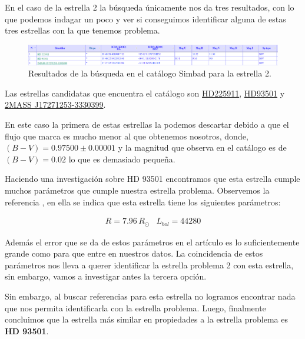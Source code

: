 \documentclass{aa} %
\begin{document}
En el caso de la estrella 2 la búsqueda únicamente nos da tres resultados, con lo que podemos indagar un poco y ver si conseguimos identificar alguna de estas tres estrellas con la que tenemos problema.

\begin{figure}[h!]
\begin{center}
\includegraphics[scale=0.2]{simbad2.png}
\caption{Resultados de la búsqueda en el catálogo Simbad para la estrella 2.}
\end{center}
\end{figure}

Las estrellas candidatas que encuentra el catálogo son \href{https://simbad.cds.unistra.fr/simbad/sim-id?Ident=%402903109&Name=HD%20225911&submit=submit}{HD225911}, \href{https://simbad.cds.unistra.fr/simbad/sim-id?Ident=%403201202&Name=HD%20%2093501&submit=submit}{HD93501} y \href{https://simbad.cds.unistra.fr/simbad/sim-id?Ident=%408542189&Name=2MASS%20J17271253-3330399&submit=submit}{2MASS J17271253-3330399}.

En este caso la primera de estas estrellas la podemos descartar debido a que el flujo que marca \cite{CiteDrive2022} es mucho menor al que obtenemos nosotros, donde, $(B-V) = 0.97500 \pm 0.00001$ y la magnitud que observa en el catálogo es de $(B-V) = 0.02$ lo que es demasiado pequeña.

Haciendo una investigación sobre HD 93501 encontramos que esta estrella cumple muchos parámetros que cumple nuestra estrella problema. Observemos la referencia \cite{Richard_2018}, en ella se indica que esta estrella tiene los siguientes parámetros:

$$
\begin{array}{cc}
R = 7.96 \, R_{\odot} & L_{bol} = 44280
\end{array}
$$

Además el error que se da de estos parámetros en el artículo es lo suficientemente grande como para que entre en nuestros datos. La coincidencia de estos parámetros nos lleva a querer identificar la estrella problema 2 con esta estrella, sin embargo, vamos a investigar antes la tercera opción.

Sin embargo, al buscar referencias para esta estrella no logramos encontrar nada que nos permita identificarla con la estrella problema. Luego, finalmente concluimos que la estrella más similar en propiedades a la estrella problema es \textbf{HD 93501}.
\end{document}
